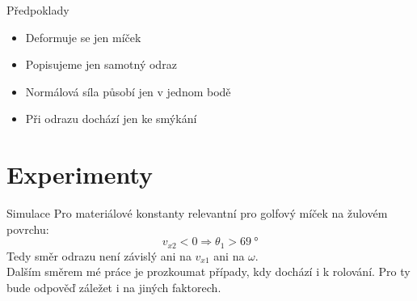 \documentclass{beamer}
\begin{document}
 \begin{frame}{Předpoklady}
 \begin{itemize}
  \item Deformuje se jen míček
  \item Popisujeme jen samotný odraz
  \item Normálová síla působí jen v jednom bodě
  \item Při odrazu dochází jen ke smýkání 
 \end{itemize}
\end{frame}

\section{Experimenty}

 \begin{frame}{Simulace}
 Pro materiálové konstanty relevantní pro golfový míček na žulovém povrchu:
 \[
  v_{x2} < 0 \Rightarrow \theta_1 > \qty{69}{\degree}
 \]
 Tedy směr odrazu není závislý ani na $v_{x1}$ ani na $\omega$.\\
 Dalším směrem mé práce je prozkoumat případy, kdy dochází i k rolování. Pro ty
 bude odpověď záležet i na jiných faktorech.
\end{frame}
\end{document}
